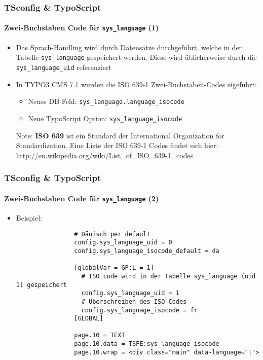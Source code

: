 \begin{frame}[fragile]
	\frametitle{TSconfig \& TypoScript}
	\framesubtitle{Zwei-Buchstaben Code für \texttt{sys\_language} (1)}

	\begin{itemize}
		\item Das Sprach-Handling wird durch Datensätze durchgeführt, welche in der Tabelle 
			\texttt{sys\_language} gespeichert werden. Diese wird üblicherweise durch die \texttt{sys\_language\_uid} referenziert
		\item In TYPO3 CMS 7.1 wurden die ISO 639-1 Zwei-Buchstaben-Codes eigeführt:

			\begin{itemize}
				\item Neues DB Feld: \texttt{sys\_language.language\_isocode}
				\item Neue TypoScript Option: \texttt{sys\_language\_isocode}
			\end{itemize}


		\vspace{1cm}

		\small
			Note: \textbf{ISO 639} ist ein Standard der International Organization
			for Standardization. Eine Liste der ISO 639-1 Codes findet sich hier:\newline
			\url{http://en.wikipedia.org/wiki/List_of_ISO_639-1_codes}
		\normalsize

	\end{itemize}

\end{frame}


\begin{frame}[fragile]
	\frametitle{TSconfig \& TypoScript}
	\framesubtitle{Zwei-Buchstaben Code für \texttt{sys\_language} (2)}

	\begin{itemize}
		\item Beispiel:

			\begin{lstlisting}
				# Dänisch per default
				config.sys_language_uid = 0
				config.sys_language_isocode_default = da

				[globalVar = GP:L = 1]
				  # ISO code wird in der Tabelle sys_language (uid 1) gespeichert
				  config.sys_language_uid = 1
				  # Überschreiben des ISO Codes
				  config.sys_language_isocode = fr
				[GLOBAL]

				page.10 = TEXT
				page.10.data = TSFE:sys_language_isocode
				page.10.wrap = <div class="main" data-language="|">
			\end{lstlisting}

	\end{itemize}

\end{frame}

